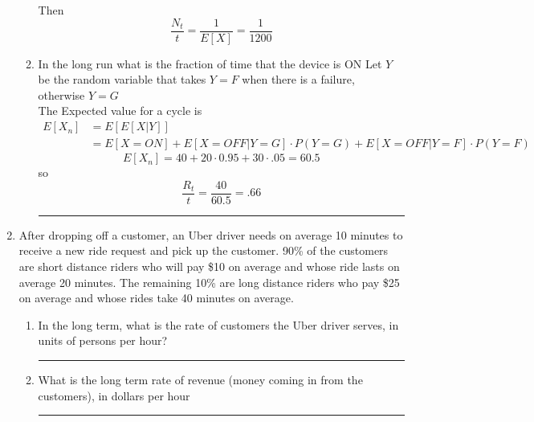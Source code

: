 \documentclass{article} %
\theoremstyle{plain}
\theoremstyle{case}
\begin{document}
\begin{enumerate}[label={\fbox{\textbf{Exercise \#\arabic* :}}}]
\begin{enumerate}
        Then
        \[ \frac{N_t}{t} = \frac{1}{E[X]} =  \frac{1}{1200} \]
      \item In the long run what is the fraction of time that the device is ON
        Let $Y$ be the random variable that takes $Y=F$ when there is a
        failure, otherwise $Y=G$\\
       The Expected value for a cycle is
       \begin{align*}
         E[X_n] &= E[E[X|Y]] \\
                    & = E[X=ON]
                            + E[X=OFF|Y=G] \cdot P(Y=G) 
                            + E[X=OFF|Y=F] \cdot P(Y=F)
       \end{align*}
       \[ E[X_n] = 40 + 20 \cdot 0.95 + 30 \cdot .05 = 60.5 \]
       so
       \[ \frac{R_t}{t} = \frac{40}{60.5} = .66 \]
\par\noindent\rule{\textwidth}{0.1pt}
    \end{enumerate}
  \newpage
  \item After dropping off a customer, an Uber driver needs on average 10
    minutes to receive a new ride request and pick up the customer.
    90\% of the customers are short distance riders who will pay
    \$10 on average and whose ride lasts on average 20 minutes.
    The remaining 10\% are long distance riders who pay \$25 on
    average and whose rides take 40 minutes on average.
    \begin{enumerate}
      \item In the long term, what is the rate of customers the Uber driver serves, in units of persons per hour?
\par\noindent\rule{\textwidth}{0.1pt}
      \item What is the long term rate of revenue (money coming in from the customers), in dollars per hour
\par\noindent\rule{\textwidth}{0.1pt}
    \end{enumerate}


\end{enumerate}
\end{document}

